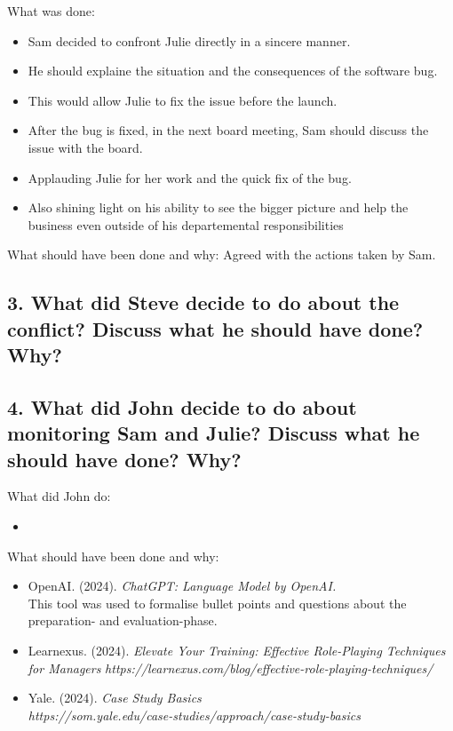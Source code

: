 \documentclass[a4paper,10pt]{article}
\begin{document}
What was done:
\begin{itemize}
    \item Sam decided to confront Julie directly in a sincere manner.
    \item He should explaine the situation and the consequences of the software bug.
    \item This would allow Julie to fix the issue before the launch.
    \item After the bug is fixed, in the next board meeting, Sam should discuss the issue with the board.
    \item Applauding Julie for her work and the quick fix of the bug.
    \item Also shining light on his ability to see the bigger picture and help the business even outside of his departemental responsibilities
\end{itemize}

What should have been done and why: Agreed with the actions taken by Sam.

\subsection{3. What did Steve decide to do about the conflict? Discuss what he should have done? Why?}

\subsection{4. What did John decide to do about monitoring Sam and Julie? Discuss what he should have done? Why?}

What did John do:
\begin{itemize}
    \item 
\end{itemize}

What should have been done and why:


\begin{itemize}
    \item OpenAI. (2024). \textit{ChatGPT: Language Model by OpenAI.} \\ 
    This tool was used to formalise bullet points and questions about the preparation- and evaluation-phase.
    \item Learnexus. (2024). \textit{Elevate Your Training: Effective Role-Playing Techniques for Managers} \textit{https://learnexus.com/blog/effective-role-playing-techniques/}
    \item Yale. (2024). \textit{Case Study Basics} \\ \textit{https://som.yale.edu/case-studies/approach/case-study-basics}
\end{itemize}
\end{document}
